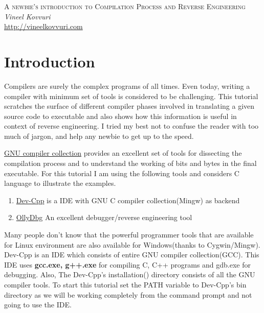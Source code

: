 \documentclass{article}
\begin{document}
\begin{titlepage}
   \begin{center}
      \Large\textsc{A newbie's introduction to Compilation Process and Reverse Engineering}\\
      \vspace{5mm}
      \Large\textit{Vineel Kovvuri}\\
      \url{http://vineelkovvuri.com}\\
   \end{center}
\end{titlepage}

\tableofcontents

\newpage
\section{Introduction}
Compilers are surely the complex programs of all times. Even today, writing a compiler with minimum set of tools is considered to be challenging. This tutorial scratches the surface of different compiler phases involved in translating a given source code to executable and also shows how this information is useful in context of reverse engineering. I tried my best not to confuse the reader with too much of jargon, and help any newbie to get up to the speed.

\href{''https://en.wikipedia.org/wiki/GNU\_Compiler\_Collection''}{GNU compiler collection} provides an excellent set of tools for dissecting the compilation process and to understand the working of bits and bytes in the final executable. For this tutorial I am using the following tools and considers C language to illustrate the examples.

\begin{enumerate}[noitemsep]
    \item \href{''http://orwelldevcpp.blogspot.com/''}{Dev-Cpp} is a IDE with GNU C compiler collection(Mingw) as backend
    \item \href{''http://www.ollydbg.de/''}{OllyDbg} An excellent debugger/reverse engineering tool
\end{enumerate}

Many people don't know that the powerful programmer tools that are available for Linux environment are also available for Windows(thanks to Cygwin/Mingw). Dev-Cpp is an IDE which consists of entire GNU compiler collection(GCC). This IDE uses \textbf{gcc.exe, g++.exe} for compiling C, C++ programs and gdb.exe for debugging. Also, The Dev-Cpp's installation() directory consists of all the GNU compiler tools. To start this tutorial set the PATH variable to Dev-Cpp's bin directory as we will be working completely from the command prompt and not going to use the IDE.
\end{document}

